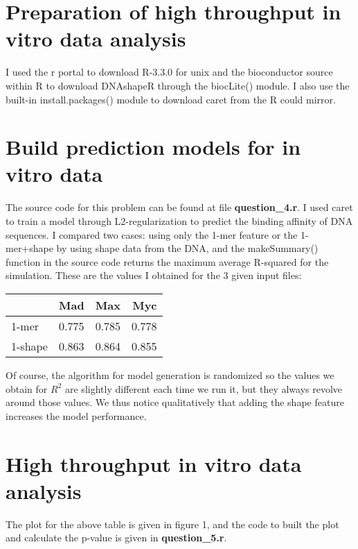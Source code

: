 \documentclass[11pt]{article}
\begin{document}
\section{Preparation of high throughput in vitro data analysis}

I used the r portal to download R-3.3.0 for unix and the bioconductor source within R to download DNAshapeR through the biocLite() module. I also use the built-in install.packages() module to download caret from the R could mirror.

\section{Build prediction models for in vitro data}

The source code for this problem can be found at file \textbf{question\_4.r}. I used caret to train a model through L2-regularization to predict the binding affinity of DNA sequences. I compared two cases: using only the 1-mer feature or the 1-mer+shape by using shape data from the DNA, and the makeSummary() function in the source code returns the maximum average R-squared for the simulation. These are the values I obtained for the 3 given input files: \\

\begin{center}
\begin{tabular}{ | l | c | c | r | }
\hline
   & Mad & Max & Myc \\
\hline
  1-mer & 0.775 & 0.785 & 0.778 \\
\hline  
  1-shape & 0.863 & 0.864 & 0.855 \\
\hline
\end{tabular}
\end{center}

Of course, the algorithm for model generation is randomized so the values we obtain for $R^2$ are slightly different each time we run it, but they always revolve around those values. We thus notice qualitatively that adding the shape feature increases the model performance. 

\section{High throughput in vitro data analysis}

The plot for the above table is given in figure 1, and the code to built the plot and calculate the p-value is given in \textbf{question\_5.r}. 
\end{document}
